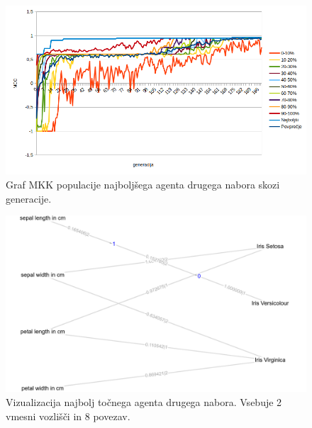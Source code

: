 \begin{figure}[H]
    \begin{center}
        \includegraphics[width=13cm]{iris/2/mcc}
    \end{center}
    \caption{Graf MKK populacije najboljšega agenta drugega nabora skozi generacije.}
    \label{fig:iris_mcc_2}
\end{figure}

\begin{figure}[H]
    \begin{center}
        \includegraphics[width=13cm]{iris/2/acc_g}
    \end{center}
    \caption{Vizualizacija najbolj točnega agenta drugega nabora. Vsebuje 2 vmesni vozlišči in 8 povezav.}
    \label{fig:iris_acc_2_g}
\end{figure}

